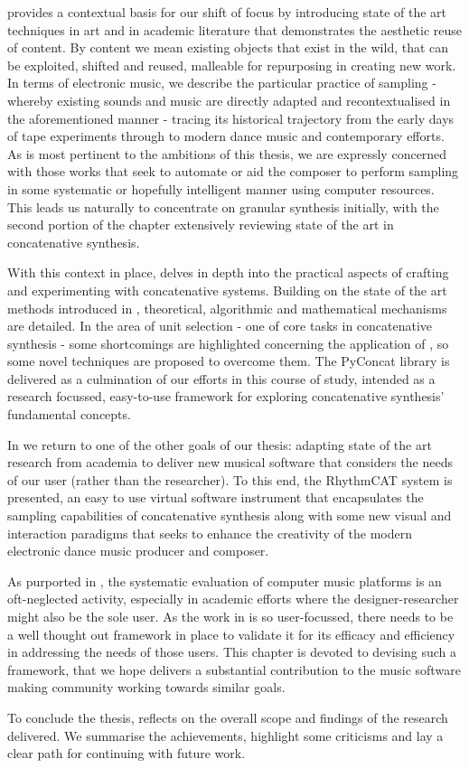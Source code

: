  provides a contextual basis for our shift of focus by introducing state of the art techniques in art and in academic literature that demonstrates the aesthetic reuse of content. By content we mean existing objects that exist in the wild, that can be exploited, shifted and reused, malleable for repurposing in creating new work. In terms of electronic music, we describe the particular practice of sampling - whereby existing sounds and music are directly adapted and recontextualised in the aforementioned manner - tracing its historical trajectory from the early days of tape experiments through to modern dance music and contemporary efforts. As is most pertinent to the ambitions of this thesis, we are expressly concerned with those works that seek to automate or aid the composer to perform sampling in some systematic or hopefully intelligent manner using computer resources. This leads us naturally to concentrate on granular synthesis initially, with the second portion of the chapter extensively reviewing state of the art in concatenative synthesis.

With this context in place,  delves in depth into the practical aspects of crafting and experimenting with concatenative systems. Building on the state of the art methods introduced in , theoretical, algorithmic and mathematical mechanisms are detailed. In the area of unit selection - one of core tasks in concatenative synthesis - some shortcomings are highlighted concerning the application of , so some novel techniques are proposed to overcome them. The PyConcat library is delivered as a culmination of our efforts in this course of study, intended as a research focussed, easy-to-use framework for exploring concatenative synthesis’ fundamental concepts.


In  we return to one of the other goals of our thesis: adapting state of the art research from academia to deliver new musical software that considers the needs of our user (rather than the researcher). To this end, the RhythmCAT system is presented, an easy to use virtual software instrument that encapsulates the sampling capabilities of concatenative synthesis along with some new visual and interaction paradigms that seeks to enhance the creativity of the modern electronic dance music producer and composer. 

As purported in , the systematic evaluation of computer music platforms is an oft-neglected activity, especially in academic efforts where the designer-researcher might also be the sole user. As the work in  is so user-focussed,  there needs to be a well thought out framework in place to validate it for its efficacy and efficiency in addressing the needs of those users. This chapter is devoted to devising such a framework, that we hope delivers a substantial contribution to the music software making community working towards similar goals.

To conclude the thesis,  reflects on the overall scope and findings of the research delivered. We summarise the achievements, highlight some criticisms and lay a clear path for continuing with future work. 


 
